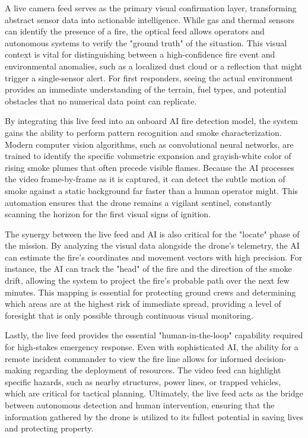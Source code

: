 \documentclass[journal, onecolumn]{IEEEtran}
\begin{document}
A live camera feed serves as the primary visual confirmation layer, transforming abstract sensor data into actionable intelligence. While gas and thermal sensors can identify the presence of a fire, the optical feed allows operators and autonomous systems to verify the "ground truth" of the situation. This visual context is vital for distinguishing between a high-confidence fire event and environmental anomalies, such as a localized dust cloud or a reflection that might trigger a single-sensor alert. For first responders, seeing the actual environment provides an immediate understanding of the terrain, fuel types, and potential obstacles that no numerical data point can replicate.


By integrating this live feed into an onboard AI fire detection model, the system gains the ability to perform pattern recognition and smoke characterization. Modern computer vision algorithms, such as convolutional neural networks, are trained to identify the specific volumetric expansion and grayish-white color of rising smoke plumes that often precede visible flames. Because the AI processes the video frame-by-frame as it is captured, it can detect the subtle motion of smoke against a static background far faster than a human operator might. This automation ensures that the drone remains a vigilant sentinel, constantly scanning the horizon for the first visual signs of ignition.


The synergy between the live feed and AI is also critical for the "locate" phase of the mission. By analyzing the visual data alongside the drone’s telemetry, the AI can estimate the fire's coordinates and movement vectors with high precision. For instance, the AI can track the "head" of the fire and the direction of the smoke drift, allowing the system to project the fire's probable path over the next few minutes. This mapping is essential for protecting ground crews and determining which areas are at the highest risk of immediate spread, providing a level of foresight that is only possible through continuous visual monitoring.


Lastly, the live feed provides the essential "human-in-the-loop" capability required for high-stakes emergency response. Even with sophisticated AI, the ability for a remote incident commander to view the fire line allows for informed decision-making regarding the deployment of resources. The video feed can highlight specific hazards, such as nearby structures, power lines, or trapped vehicles, which are critical for tactical planning. Ultimately, the live feed acts as the bridge between autonomous detection and human intervention, ensuring that the information gathered by the drone is utilized to its fullest potential in saving lives and protecting property.
\end{document}
